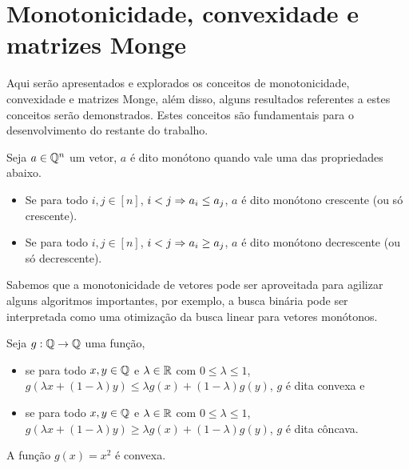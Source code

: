 \section{Monotonicidade, convexidade e matrizes Monge}
\label{MatrizMonge}


Aqui serão apresentados e explorados os conceitos de monotonicidade, convexidade e matrizes Monge, além disso, alguns resultados referentes a estes conceitos serão demonstrados. Estes conceitos são fundamentais para o desenvolvimento do restante do trabalho.

\begin{defi}
Seja $a \in \mathbb{Q}^n$ um vetor, $a$ é dito monótono quando vale uma das propriedades abaixo.
    \begin{itemize}
        \item Se para todo $i,j \in [n]$, $i < j \Rightarrow a_i \leq a_j$, $a$ é dito monótono crescente (ou só crescente).
        \item Se para todo $i,j \in [n]$, $i < j \Rightarrow a_i \geq a_j$, $a$ é dito monótono decrescente (ou só decrescente).
    \end{itemize}
\end{defi}

Sabemos que a monotonicidade de vetores pode ser aproveitada para agilizar alguns algoritmos importantes, por exemplo, a busca binária pode ser interpretada como uma otimização da busca linear para vetores monótonos. 

\begin{defi}
Seja $g : \mathbb{Q} \to \mathbb{Q}$ uma função,
    \begin{itemize}
        \item se para todo $x,y \in \mathbb{Q}$ e $\lambda \in \mathbb{R}$ com $0 \leq \lambda \leq 1$, $g(\lambda x + (1 - \lambda)y) \leq \lambda g(x) + (1 - \lambda) g(y)$, $g$ é dita convexa e 
        \item se para todo $x,y \in \mathbb{Q}$ e $\lambda \in \mathbb{R}$ com $0 \leq \lambda \leq 1$, $g(\lambda x + (1 - \lambda)y) \geq \lambda g(x) + (1 - \lambda) g(y)$, $g$ é dita côncava.
    \end{itemize}
\end{defi}

\begin{prop} \label{prop:sqConv}
A função $g(x) = x^2$ é convexa. 
\end{prop}

